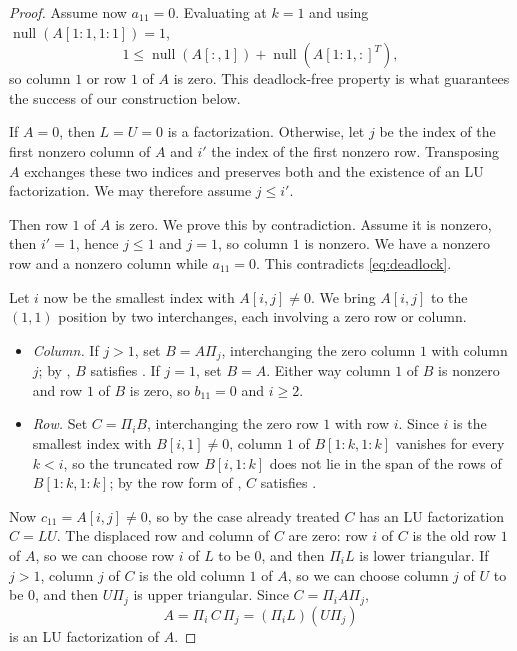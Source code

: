 \documentclass[10pt,twoside]{siamart1116}
\DeclareMathOperator{\nl}{null}
\numberwithin{theorem}{section}
\begin{document}
\begin{proof}
  Assume now $a_{11} = 0$. Evaluating  at $k = 1$ and using $\nl(A[1:1,1:1]) = 1$,
  \begin{equation}\label{eq:deadlock}
    1 \le \nl(A[:,1]) + \nl({A[1:1,:]}^T),
  \end{equation}
  so column $1$ or row $1$ of $A$ is zero. This deadlock-free property is what guarantees the success of our construction below.

  If $A = 0$, then $L = U = 0$ is a factorization. Otherwise, let $j$ be the index of the first nonzero column of $A$ and $i'$ the index of the first nonzero row. Transposing $A$ exchanges these two indices and preserves both  and the existence of an LU factorization. We may therefore assume $j \le i'$.

  Then row $1$ of $A$ is zero. We prove this by contradiction. Assume it is nonzero, then $i' = 1$, hence $j \le 1$ and $j = 1$, so column $1$ is nonzero. We have a nonzero row and a nonzero column while $a_{11} = 0$. This contradicts \cref{eq:deadlock}.

  Let $i$ now be the smallest index with $A[i,j] \neq 0$. We bring $A[i,j]$ to the $(1,1)$ position by two interchanges, each involving a zero row or column.
  \begin{itemize}
    \item \emph{Column.} If $j > 1$, set $B = A \Pi_j$, interchanging the zero column $1$ with column $j$; by , $B$ satisfies . If $j = 1$, set $B = A$. Either way column $1$ of $B$ is nonzero and row $1$ of $B$ is zero, so $b_{11} = 0$ and $i \ge 2$.
    \item \emph{Row.} Set $C = \Pi_i B$, interchanging the zero row $1$ with row $i$. Since $i$ is the smallest index with $B[i,1] \neq 0$, column $1$ of $B[1:k,1:k]$ vanishes for every $k < i$, so the truncated row $B[i,1:k]$ does not lie in the span of the rows of $B[1:k,1:k]$; by the row form of , $C$ satisfies .
  \end{itemize}
  Now $c_{11} = A[i,j] \neq 0$, so by the case already treated $C$ has an LU factorization $C = LU$. The displaced row and column of $C$ are zero: row $i$ of $C$ is the old row $1$ of $A$, so we can choose row $i$ of $L$ to be $0$, and then $\Pi_i L$ is lower triangular. If $j > 1$, column $j$ of $C$ is the old column $1$ of $A$, so we can choose column $j$ of $U$ to be $0$, and then $U \Pi_j$ is upper triangular. Since $C = \Pi_i A \Pi_j$,
  \[
    A = \Pi_i\, C\, \Pi_j = (\Pi_i L)(U \Pi_j)
  \]
  is an LU factorization of $A$.

\end{proof}
\end{document}

